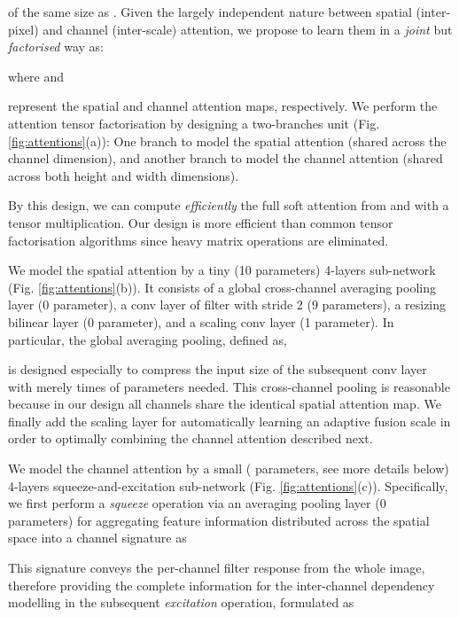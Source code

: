 \documentclass[10pt,twocolumn,letterpaper]{article}
\begin{document}
of the same size as .
Given the largely independent nature between spatial (inter-pixel) and
channel (inter-scale) attention, 
we propose to learn them in a {\em joint} but {\em factorised} way as:

where 
 and
 
represent the spatial and channel attention maps,
respectively. 
We perform the attention tensor factorisation 
by designing a two-branches unit (Fig. \ref{fig:attentions}(a)):
One branch to model the spatial attention  (shared across the channel dimension),
and another branch to model the channel attention  (shared across both height and width dimensions).

By this design, we can compute {\em efficiently} the full soft attention  
from  and  
with a tensor multiplication.
Our design is more efficient 
than common tensor factorisation algorithms
\cite{kolda2009tensor}
since heavy matrix operations are eliminated.



\vspace{0.01cm}
We model the spatial attention by a tiny (10 parameters) 4-layers sub-network
(Fig. \ref{fig:attentions}(b)).
It consists of a global cross-channel averaging pooling layer (0 parameter),
a conv layer of  filter with stride 2
(9 parameters),
a resizing bilinear layer (0 parameter),
and a scaling conv layer (1 parameter).
In particular, the global averaging pooling, defined as,

is designed especially to compress the input size of the subsequent conv layer
with merely  times of parameters needed.
This cross-channel pooling is reasonable because in our design all channels
share the identical spatial attention map.
We finally add the scaling layer for automatically learning an adaptive fusion scale 
in order to optimally combining the channel attention described next.

\vspace{0.01cm}
We model the channel attention by a small 
( parameters, see more details below) 4-layers
squeeze-and-excitation sub-network (Fig. \ref{fig:attentions}(c)).
Specifically, we first perform a {\em squeeze} operation 
via an averaging pooling layer (0 parameters) for 
aggregating feature information distributed across the spatial space into
a channel signature as 

This signature conveys the per-channel filter response from the whole image,
therefore providing the complete information for the inter-channel dependency modelling
in the subsequent {\em excitation} operation, formulated as
\end{document}
